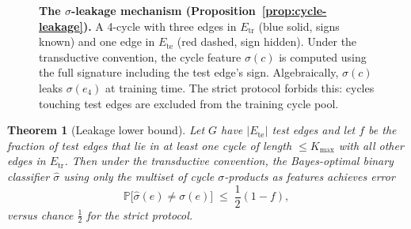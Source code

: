 \documentclass[11pt,a4paper]{article}
\newtheorem{theorem}{Theorem}[section]
\theoremstyle{remark}
\newcommand{\Prob}{\mathbb{P}}
\begin{document}
\begin{figure}[h]
\centering
{}
\caption{\textbf{The $\sigma$-leakage mechanism
(Proposition~\ref{prop:cycle-leakage}).} A 4-cycle with three
edges in $E_\text{tr}$ (blue solid, signs known) and one edge in
$E_\text{te}$ (red dashed, sign hidden). Under the transductive
convention, the cycle feature $\sigma(c)$ is computed using the
full signature including the test edge's sign. Algebraically,
$\sigma(c)$ leaks $\sigma(e_4)$ at training time. The strict
protocol forbids this: cycles touching test edges are excluded
from the training cycle pool.}
\label{fig:leakage-mechanism}
\end{figure}

\begin{theorem}[Leakage lower bound]\label{thm:leakage-lower}
Let $G$ have $|E_{\text{te}}|$ test edges and let $f$ be the
fraction of test edges that lie in at least one cycle of length
$\leq K_{\max}$ with all other edges in $E_{\text{tr}}$. Then
under the transductive convention, the Bayes-optimal binary
classifier $\hat\sigma$ using only the multiset of cycle
$\sigma$-products as features achieves error
\[
  \Prob\!\bigl[\hat\sigma(e) \neq \sigma(e)\bigr]
  \;\leq\; \frac{1}{2}(1 - f),
\]
versus chance $\frac{1}{2}$ for the strict protocol.
\end{theorem}
\end{document}
